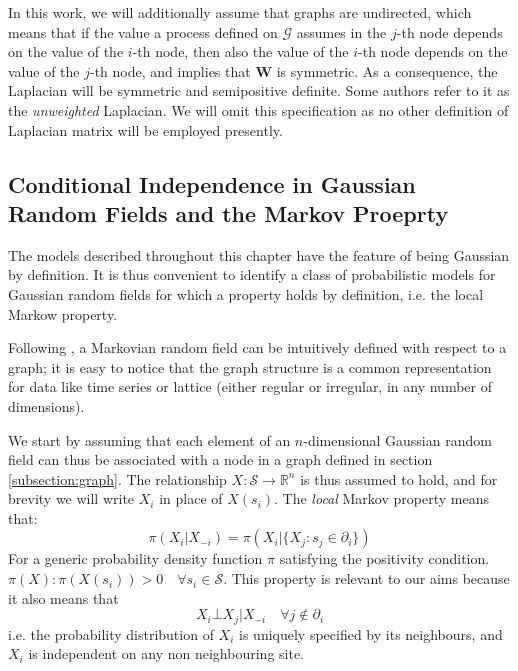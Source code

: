 \documentclass[openany, 11pt, oneside]{book}
\begin{document}
In this work, we will additionally assume that graphs are undirected, which means that if the value a process defined on $\mathcal{G}$ assumes in the $j$-th node depends on the value of the $i$-th node, then also the value of the $i$-th node depends on the value of the $j$-th node, and implies that $\boldsymbol{W}$ is symmetric. As a consequence, the Laplacian will be symmetric and semipositive definite. Some authors refer to it as the \textit{unweighted} Laplacian. We will omit this specification as no other definition of Laplacian matrix will be employed presently.

 
\subsection{Conditional Independence in Gaussian Random Fields and the Markov Proeprty}\label{subsection:sparse}

The models described throughout this chapter have the feature of being Gaussian by definition. It is thus convenient to identify a class of probabilistic models for Gaussian random fields for which a property holds by definition, i.e. the local Markow property. 

Following \parencite[][Section 2.2]{GMRFs}, a Markovian random field can be intuitively defined with respect to a graph; it is easy to notice that the graph structure is a common representation for data like time series or lattice (either regular or irregular, in any number of dimensions). 

We start by assuming that each element of an $n$-dimensional Gaussian random field can thus be associated with a node in a graph defined in section \ref{subsection:graph}. The relationship $X:\mathcal{S} \rightarrow \mathbb{R}^n$ is thus assumed to hold, and for brevity we will write $X_i$ in place of $X(s_i)$. The \textit{local} Markov property \parencite{HammersleyClifford} means that:
%
\begin{equation}
\pi(X_i \vert X_{-i}) = \pi \left(X_i \vert \lbrace X_j : s_j \in \partial_i \rbrace \right)
    \label{eq:gMarkov}
\end{equation}
%
 For a generic probability density function $\pi$ satisfying the positivity condition. $\pi(X) : \pi(X(s_i)) > 0 \quad \forall s_i \in \mathcal{S}$. This property is relevant to our aims because it also means that
 $$
 X_i \bot X_j  \vert X_{-i} \quad \forall j \notin \partial_i
 $$
i.e. the probability distribution of $X_i$ is uniquely specified by its neighbours, and $X_i$ is independent on any non neighbouring site.
\end{document}
